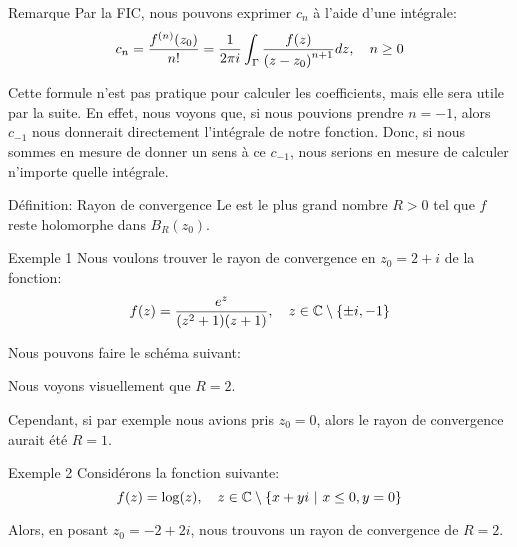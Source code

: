 \documentclass[a4paper]{article}
\begin{document}
\begin{parag}{Remarque}
    Par la FIC, nous pouvons exprimer $c_n$ à l'aide d'une intégrale: 
    \[c_n = \frac{f^{\left(n\right)}\left(z_0\right)}{n!} = \frac{1}{2\pi i} \int_{\Gamma} \frac{f\left(z\right)}{\left(z - z_0\right)^{n+1}}dz, \mathspace n \geq 0\]
    
    Cette formule n'est pas pratique pour calculer les coefficients, mais elle sera utile par la suite. En effet, nous voyons que, si nous pouvions prendre $n = -1$, alors $c_{-1}$ nous donnerait directement l'intégrale de notre fonction. Donc, si nous sommes en mesure de donner un sens à ce $c_{-1}$, nous serions en mesure de calculer n'importe quelle intégrale.
\end{parag}

\begin{parag}{Définition: Rayon de convergence}
    Le  est le plus grand nombre $R > 0$ tel que $f$ reste holomorphe dans $B_R\left(z_0\right)$.
\end{parag}

\begin{parag}{Exemple 1}
    Nous voulons trouver le rayon de convergence en $z_0 = 2 + i$ de la fonction: 
    \[f\left(z\right) = \frac{e^z}{\left(z^2 + 1\right)\left(z+1\right)}, \mathspace z \in \mathbb{C} \setminus \left\{\pm i, -1\right\}\]
    
    Nous pouvons faire le schéma suivant:

    Nous voyons visuellement que $R = 2$.

    Cependant, si par exemple nous avions pris $z_0 = 0$, alors le rayon de convergence aurait été $R = 1$.
\end{parag}

\begin{parag}{Exemple 2}
    Considérons la fonction suivante: 
    \[f\left(z\right) = \log\left(z\right), \mathspace z \in \mathbb{C} \setminus \left\{x + yi \suchthat x \leq 0, y = 0\right\}\]
    
    Alors, en posant $z_0 = -2 + 2i$, nous trouvons un rayon de convergence de $R = 2$.

\end{parag}
\end{document}
